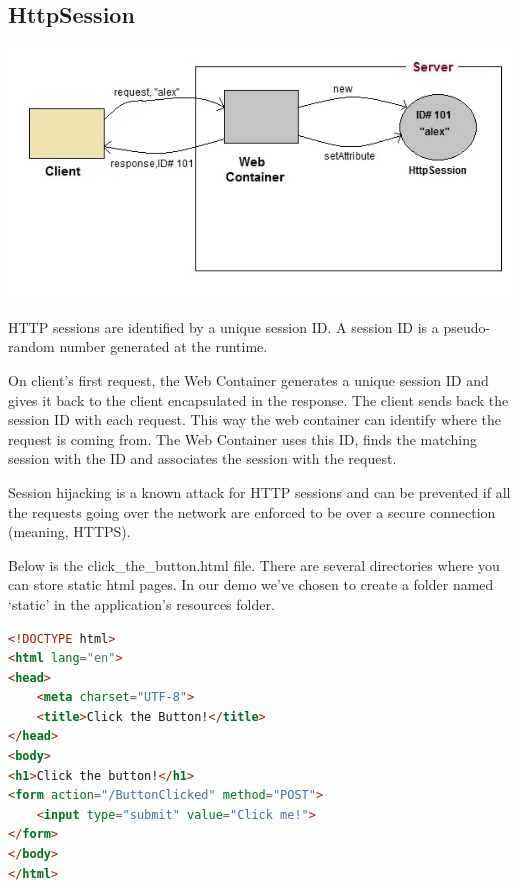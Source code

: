 \subsection{HttpSession}

\includegraphics[width=\textwidth]{./images/chapter8/httpsession}

HTTP sessions are identified by a unique session ID.  A session ID is a pseudo-random number generated at the runtime. 

On client's first request, the Web Container generates a unique session ID and gives it back to the client encapsulated in the response. 
The client sends back the session ID with each request. This way the web container can identify where the request is coming from.
The Web Container uses this ID, finds the matching session with the ID and associates the session with the request.

Session hijacking is a known attack for HTTP sessions and can be prevented if all the requests going over the network are enforced to be over a secure connection (meaning, HTTPS).

Below is the click\_the\_button.html file.  There are several directories where you can store static html pages. In our demo we've chosen to create a folder named `static' in the application's resources folder.
\begin{lstlisting}[language=html]
<!DOCTYPE html>
<html lang="en">
<head>
	<meta charset="UTF-8">
	<title>Click the Button!</title>
</head>
<body>
<h1>Click the button!</h1>
<form action="/ButtonClicked" method="POST">
	<input type="submit" value="Click me!">
</form>
</body>
</html>
\end{lstlisting}

